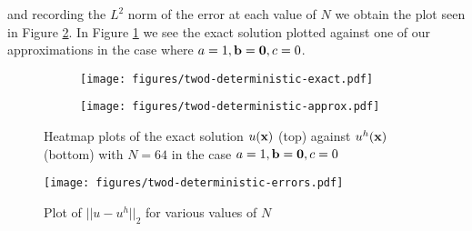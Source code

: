 and recording the $L^2$ norm of the error at each value of $N$ we obtain the
plot seen in Figure \ref{fig:twod-deterministic-error}. In Figure
\ref{fig:twod-deterministic-exact-v-approx} we see the exact solution plotted
against one of our approximations in the case where $a = 1, \mathbf{b} = \mathbf{0}, c =
0$.

\begin{figure}
    \centering
    \begin{subfigure}[b]{0.75\textwidth}
        \centering
        \texttt{[image: figures/twod-deterministic-exact.pdf]}
    \end{subfigure}
    \begin{subfigure}[b]{0.75\textwidth}
        \centering
        \texttt{[image: figures/twod-deterministic-approx.pdf]}
    \end{subfigure}
    \caption{Heatmap plots of the exact solution $u(\mathbf{x})$ (top) against
             $u^h(\mathbf{x})$ (bottom) with $N = 64$ in the case
             $a = 1, \mathbf{b} = \mathbf{0}, c = 0$}
    \label{fig:twod-deterministic-exact-v-approx}
\end{figure}

\begin{figure}
    \centering
    \texttt{[image: figures/twod-deterministic-errors.pdf]}
    \caption{Plot of $|| u - u^h ||_2$ for various values of  $N$}
    \label{fig:twod-deterministic-error}
\end{figure}
